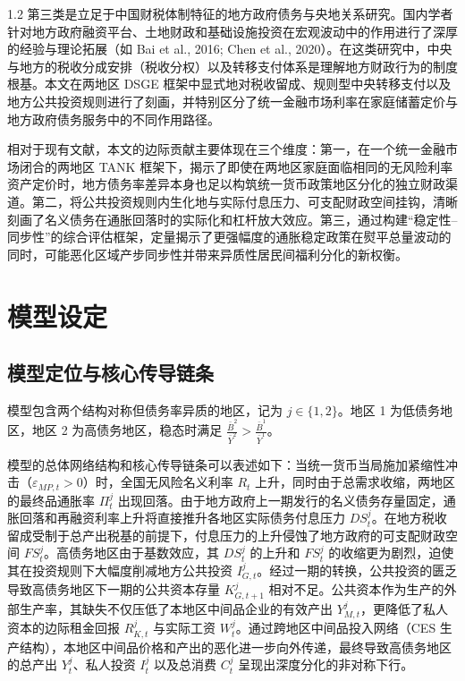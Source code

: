 \documentclass[12pt,UTF8]{ctexart}
\begin{document}
\begin{spacing}{1.2}
		第三类是立足于中国财税体制特征的地方政府债务与央地关系研究。国内学者针对地方政府融资平台、土地财政和基础设施投资在宏观波动中的作用进行了深厚的经验与理论拓展（如 Bai et al., 2016; Chen et al., 2020）。在这类研究中，中央与地方的税收分成安排（税收分权）以及转移支付体系是理解地方财政行为的制度根基。本文在两地区 DSGE 框架中显式地对税收留成、规则型中央转移支付以及地方公共投资规则进行了刻画，并特别区分了统一金融市场利率在家庭储蓄定价与地方政府债务服务中的不同作用路径。
		
		相对于现有文献，本文的边际贡献主要体现在三个维度：第一，在一个统一金融市场闭合的两地区 TANK 框架下，揭示了即使在两地区家庭面临相同的无风险利率资产定价时，地方债务率差异本身也足以构筑统一货币政策地区分化的独立财政渠道。第二，将公共投资规则内生化地与实际付息压力、可支配财政空间挂钩，清晰刻画了名义债务在通胀回落时的实际化和杠杆放大效应。第三，通过构建“稳定性--同步性”的综合评估框架，定量揭示了更强幅度的通胀稳定政策在熨平总量波动的同时，可能恶化区域产步同步性并带来异质性居民间福利分化的新权衡。
		
		\section{模型设定}
		
		\subsection{模型定位与核心传导链条}
		
		模型包含两个结构对称但债务率异质的地区，记为 $j \in \{1, 2\}$。地区 1 为低债务地区，地区 2 为高债务地区，稳态时满足 $\frac{\bar B^2}{\bar Y^2} > \frac{\bar B^1}{\bar Y^1}$。
		
		模型的总体网络结构和核心传导链条可以表述如下：当统一货币当局施加紧缩性冲击（$\varepsilon_{MP,t}>0$）时，全国无风险名义利率 $R_t$ 上升，同时由于总需求收缩，两地区的最终品通胀率 $\Pi_t^j$ 出现回落。由于地方政府上一期发行的名义债务存量固定，通胀回落和再融资利率上升将直接推升各地区实际债务付息压力 $DS_t^j$。在地方税收留成受制于总产出税基的前提下，付息压力的上升侵蚀了地方政府的可支配财政空间 $FS_t^j$。高债务地区由于基数效应，其 $DS_t^j$ 的上升和 $FS_t^j$ 的收缩更为剧烈，迫使其在投资规则下大幅度削减地方公共投资 $I_{G,t}^j$。经过一期的转换，公共投资的匮乏导致高债务地区下一期的公共资本存量 $K_{G,t+1}^j$ 相对不足。公共资本作为生产的外部生产率，其缺失不仅压低了本地区中间品企业的有效产出 $Y_{M,t}^j$，更降低了私人资本的边际租金回报 $R_{K,t}^j$ 与实际工资 $W_t^j$。通过跨地区中间品投入网络（CES 生产结构），本地区中间品价格和产出的恶化进一步向外传递，最终导致高债务地区的总产出 $Y_t^j$、私人投资 $I_t^j$ 以及总消费 $C_t^j$ 呈现出深度分化的非对称下行。
		

\end{spacing}
\end{document}
